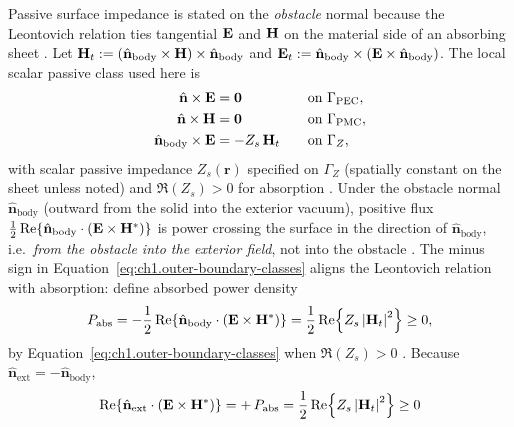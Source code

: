 Passive surface impedance is stated on the \emph{obstacle} normal because the Leontovich relation ties tangential $\mathbf{E}$ and $\mathbf{H}$ on the material side of an absorbing sheet \cite{stratton1941,harrington2001}. Let $\mathbf{H}_t:=(\hat{\mathbf{n}}_{\mathrm{body}}\times\mathbf{H})\times\hat{\mathbf{n}}_{\mathrm{body}}$ and $\mathbf{E}_t:=\hat{\mathbf{n}}_{\mathrm{body}}\times(\mathbf{E}\times\hat{\mathbf{n}}_{\mathrm{body}})$. The local scalar passive class used here is
\begin{equation}
\label{eq:ch1.outer-boundary-classes}
\begin{aligned}
\hat{\mathbf{n}}\times\mathbf{E}&=\mathbf{0}\quad &&\text{on }\Gamma_{\mathrm{PEC}},\\
\hat{\mathbf{n}}\times\mathbf{H}&=\mathbf{0}\quad &&\text{on }\Gamma_{\mathrm{PMC}},\\
\hat{\mathbf{n}}_{\mathrm{body}}\times\mathbf{E}&=-Z_s\,\mathbf{H}_t
\quad &&\text{on }\Gamma_Z,
\end{aligned}
\end{equation}
with scalar passive impedance $Z_s(\mathbf{r})$ specified on $\Gamma_Z$ (spatially constant on the sheet unless noted) and $\Re(Z_s)>0$ for absorption \cite{stratton1941,harrington2001}. Under the obstacle normal $\hat{\mathbf{n}}_{\mathrm{body}}$ (outward from the solid into the exterior vacuum), positive flux $\tfrac12\Re\{\hat{\mathbf{n}}_{\mathrm{body}}\cdot(\mathbf{E}\times\mathbf{H}^*)\}$ is power crossing the surface in the direction of $\hat{\mathbf{n}}_{\mathrm{body}}$, i.e.\ \emph{from the obstacle into the exterior field}, not into the obstacle \cite{stratton1941,harrington2001}. The minus sign in Equation~\eqref{eq:ch1.outer-boundary-classes} aligns the Leontovich relation with absorption: define absorbed power density
\begin{equation}
\label{eq:ch1.impedance-boundary-power}
P_{\mathrm{abs}}
=-\frac{1}{2}\Re\!\left\{
\hat{\mathbf{n}}_{\mathrm{body}}\cdot\left(\mathbf{E}\times\mathbf{H}^*\right)
\right\}
=\frac{1}{2}\Re\!\left\{
Z_s\left|\mathbf{H}_t\right|^2
\right\}\ge 0,
\end{equation}
by Equation~\eqref{eq:ch1.outer-boundary-classes} when $\Re(Z_s)>0$ \cite{stratton1941,harrington2001}. Because $\hat{\mathbf{n}}_{\mathrm{ext}}=-\hat{\mathbf{n}}_{\mathrm{body}}$,
\begin{equation}
\label{eq:ch1.impedance-exterior-normal-flux}
\Re\!\left\{
\hat{\mathbf{n}}_{\mathrm{ext}}\cdot\left(\mathbf{E}\times\mathbf{H}^*\right)
\right\}
=+\,P_{\mathrm{abs}}
=\frac{1}{2}\Re\!\left\{
Z_s\left|\mathbf{H}_t\right|^2
\right\}\ge 0
\end{equation}
